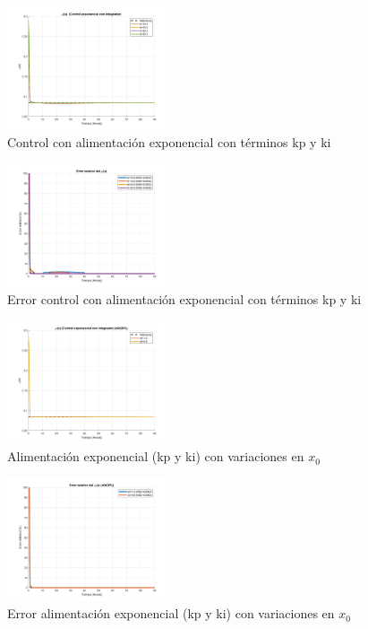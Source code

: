 \documentclass[letterpaper, 10 pt, conference]{ieeeconf}  %
\begin{document}
\begin{figure}[H]
  \centering
  \includegraphics[width=0.43\textwidth]{./Images_tp3/exp_ki.png}
  \caption{Control con alimentación exponencial con términos kp y ki}
\end{figure}
\begin{figure}[H]
  \centering
  \includegraphics[width=0.43\textwidth]{./Images_tp3/exp_err_ki.png}
  \caption{Error control con alimentación exponencial con términos kp y ki}
\end{figure}

\begin{figure}[H]
  \centering
  \includegraphics[width=0.43\textwidth]{./Images_tp3/exp_rob_x0.png}
  \caption{Alimentación exponencial (kp y ki) con variaciones en $x_{0}$ }
\end{figure}
\begin{figure}[H]
  \centering
  \includegraphics[width=0.43\textwidth]{./Images_tp3/exp_rob_err_x0.png}
  \caption{Error alimentación exponencial (kp y ki) con variaciones en $x_{0}$ }
\end{figure}
\end{document}
